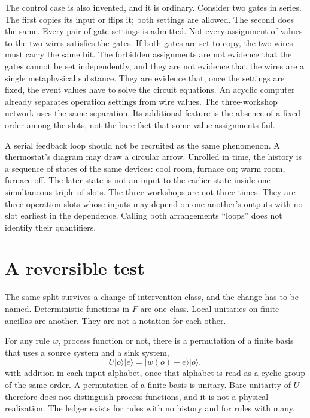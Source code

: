 \documentclass[12pt]{article}
\begin{document}
The control case is also invented, and it is ordinary. Consider two gates in series. The first copies its input or flips it; both settings are allowed. The second does the same. Every pair of gate settings is admitted. Not every assignment of values to the two wires satisfies the gates. If both gates are set to copy, the two wires must carry the same bit. The forbidden assignments are not evidence that the gates cannot be set independently, and they are not evidence that the wires are a single metaphysical substance. They are evidence that, once the settings are fixed, the event values have to solve the circuit equations. An acyclic computer already separates operation settings from wire values. The three-workshop network uses the same separation. Its additional feature is the absence of a fixed order among the slots, not the bare fact that some value-assignments fail.

A serial feedback loop should not be recruited as the same phenomenon. A thermostat's diagram may draw a circular arrow. Unrolled in time, the history is a sequence of states of the same devices: cool room, furnace on; warm room, furnace off. The later state is not an input to the earlier state inside one simultaneous triple of slots. The three workshops are not three times. They are three operation slots whose inputs may depend on one another's outputs with no slot earliest in the dependence. Calling both arrangements ``loops'' does not identify their quantifiers.

\section{A reversible test}
\label{sec:rev}

The same split survives a change of intervention class, and the change has to be named. Deterministic functions in \(F\) are one class. Local unitaries on finite ancillas are another. They are not a notation for each other.

For any rule \(w\), process function or not, there is a permutation of a finite basis that uses a source system and a sink system,
\[
U\lvert o\rangle\lvert e\rangle = \lvert w(o)+e\rangle\lvert o\rangle,
\]
with addition in each input alphabet, once that alphabet is read as a cyclic group of the same order. A permutation of a finite basis is unitary. Bare unitarity of \(U\) therefore does not distinguish process functions, and it is not a physical realization. The ledger exists for rules with no history and for rules with many.
\end{document}

